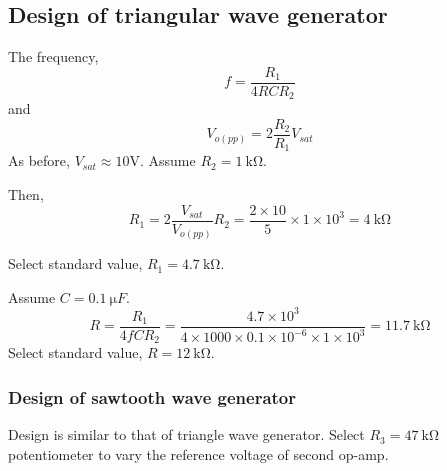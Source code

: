 \subsection{Design of triangular wave generator}
The frequency,
\[
f=\dfrac{R_1}{4RCR_2}
\] and
\[
V_{o(pp)}=2\dfrac{R_2}{R_1}V_{sat}
\]
As before, $V_{sat}\approx 10 \text{V}$. Assume $R_2=\SI{1}{\kilo\ohm}$. 
%

Then,
\[
R_1=2\dfrac{V_{sat}}{V_{o(pp)}} R_2 = \dfrac{2\times 10}{5}\times 1\times 10^3 = \SI{4}{\kilo\ohm}
\]

Select standard value, $R_1=\SI{4.7}{\kilo\ohm}$.

Assume $C=\SI{0.1}{\micro F}$.
\[
R=\dfrac{R_1}{4fCR_2} = \dfrac{4.7\times10^3}{4\times1000\times0.1\times10^{-6}\times1\times10^3} = \SI{11.7}{\kilo\ohm}
\]
Select standard value, $R=\SI{12}{\kilo\ohm}$.
\subsubsection{Design of sawtooth wave generator}
Design is similar to that of triangle wave generator. Select $R_3=\SI{47}{\kilo\ohm}$ potentiometer to vary the reference voltage of second op-amp.
%	
%	
